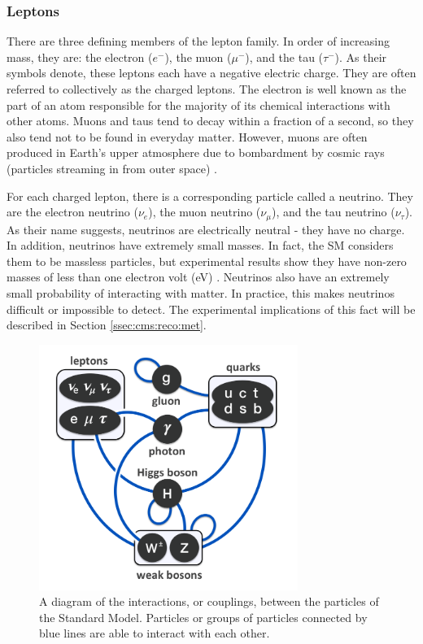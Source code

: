 \subsubsection*{Leptons}
There are three defining members of the lepton family. In order of
increasing mass, they are: the electron
($e^-$), the muon ($\mu^-$), and the tau ($\tau^-$). As their symbols
denote, these leptons each have a negative electric charge. They are
often referred to collectively as the charged leptons.
The electron is well known as the part of an atom responsible for the
majority of its chemical interactions with other atoms. Muons and taus
tend to decay within a fraction of a second, so they also tend not to
be found in everyday matter. However, muons are often produced in
Earth's upper atmosphere due to bombardment by cosmic rays (particles
streaming in from outer space) \cite{griffiths}.

For each charged lepton, there is a corresponding particle called a
neutrino. They are the electron neutrino ($\nu_e$), the muon
neutrino ($\nu_{\mu}$), and the tau neutrino ($\nu_{\tau}$). As their
name suggests, neutrinos are electrically neutral - they have no
charge. In addition, neutrinos have extremely small masses. In fact,
the SM considers them to be massless particles, but experimental
results show they have non-zero masses of less than one electron volt
(eV) \cite{pdg}. Neutrinos also have an extremely small probability of
interacting with matter. In practice, this makes neutrinos
difficult or impossible to detect. The experimental implications of
this fact will be described in Section \ref{ssec:cms:reco:met}.

\begin{figure}[h]
  \centering
  \includegraphics[width=0.75\textwidth]{figures/couplings.png}
  \caption{A diagram of the interactions, or couplings,
    between the particles of the Standard Model. Particles or groups
    of particles connected by blue lines are able to interact with
    each other.}
  \label{fig:couplings}
\end{figure}

